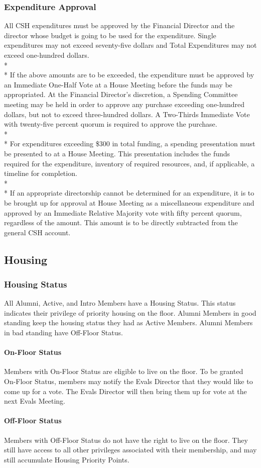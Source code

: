 \documentclass{article}
\newcommand{\asection}[1]{\subsection{#1} \label{#1}}
\newcommand{\asubsection}[1]{\subsubsection{#1} \label{#1}}
\newcommand{\asubsubsection}[1]{\paragraph{#1} \label{#1}}
\begin{document}
\asubsection{Expenditure Approval}
All CSH expenditures must be approved by the Financial Director and the director whose budget is going to be used for the expenditure.
Single expenditures may not exceed seventy-five dollars and Total Expenditures may not exceed one-hundred dollars.
\\* \\*
If the above amounts are to be exceeded, the expenditure must be approved by an Immediate One-Half Vote at a House Meeting before the funds may be appropriated.
At the Financial Director's discretion, a Spending Committee meeting may be held in order to approve any purchase exceeding one-hundred dollars, but not to exceed three-hundred dollars.
A Two-Thirds Immediate Vote with twenty-five percent quorum is required to approve the purchase.
\\*\\*
For expenditures exceeding \$300 in total funding, a spending presentation must be presented to at a House Meeting.
This presentation includes the funds required for the expenditure, inventory of required resources, and, if applicable, a timeline for completion.
\\* \\*
If an appropriate directorship cannot be determined for an expenditure, it is to be brought up for approval at House Meeting as a miscellaneous expenditure and approved by an Immediate Relative Majority vote with fifty percent quorum, regardless of the amount.
This amount is to be directly subtracted from the general CSH account.
\asection{Housing}

\asubsection{Housing Status}
All Alumni, Active, and Intro Members have a Housing Status.
This status indicates their privilege of priority housing on the floor.
Alumni Members in good standing keep the housing status they had as Active Members.
Alumni Members in bad standing have Off-Floor Status.

\asubsubsection{On-Floor Status}
Members with On-Floor Status are eligible to live on the floor.
To be granted On-Floor Status, members may notify the Evals Director that they would like to come up for a vote.
The Evals Director will then bring them up for vote at the next Evals Meeting.

\asubsubsection{Off-Floor Status}
Members with Off-Floor Status do not have the right to live on the floor.
They still have access to all other privileges associated with their membership, and may still accumulate Housing Priority Points.
\end{document}
